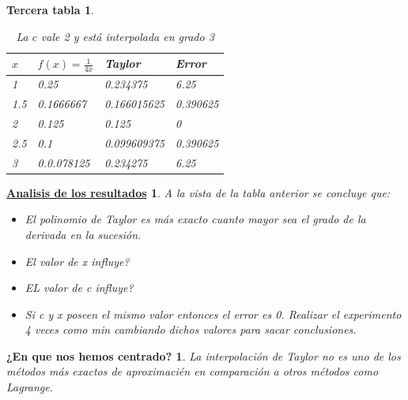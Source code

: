 \documentclass{beamer}
\newtheorem{procedimiento}{¿En que nos hemos centrado?}
\newtheorem{descripcion de los experimentos}{\underline {Descripcion de los experimentos}}
\newtheorem{analisis}{\underline {Analisis de los resultados}}
\newtheorem{adios}{Tercera tabla}
\begin{document}
\begin{frame}
\begin{adios}
\begin{table}[!hbt]
\begin{center}
\begin{tabular}[c]{||l | l ||l|l||}
\hline
\hline
$x$ & $f(x)=\frac{1}{4x}$ & {\em Taylor} & Error \\
\hline
1 &0.25& 0.234375 & 6.25 \\
\hline
1.5 &0.1666667&0.166015625& 0.390625\\
\hline
2 &0.125 &0.125 & 0 \\
\hline
2.5 &0.1 &0.099609375 & 0.390625 \\
\hline
3 & 0.0.078125 & 0.234275& 6.25 \\
\hline
\hline
\end{tabular}
\caption{La $c$ vale 2 y está interpolada en grado 3}
\end{center}
\end{table}
\end{adios}
\end{frame}


\begin{frame}
\begin{analisis}
A la vista de la tabla anterior se concluye que:
\begin {itemize}
\item El polinomio de Taylor es más exacto cuanto mayor sea el grado de la derivada en la sucesión.
\item El valor de x influye?
\item EL valor de c influye?
\item Si c y x poseen el mismo valor entonces el error es 0.
Realizar el experimento 4 veces como min cambiando dichos valores para sacar conclusiones.
\end {itemize}
\end{analisis}
\end{frame}

\begin{frame}
\begin{procedimiento}
La interpolación de Taylor no es uno de los métodos más exactos de aproximacién en comparación  a otros métodos como Lagrange.
\end {procedimiento}
\end{frame}
\end{document}
